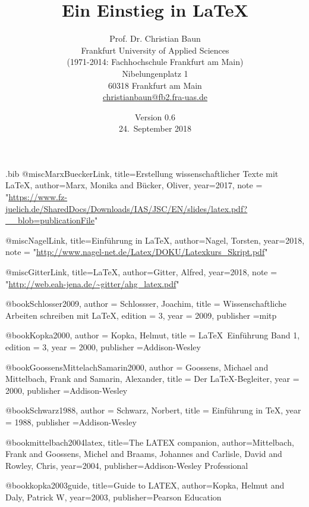 \documentclass[a4paper,10pt,twoside]{scrbook}
\begin{document}
\begin{filecontents*}{\jobname.bib}
@misc{MarxBueckerLink,
	title={{Erstellung wissenschaftlicher Texte mit \LaTeX}},
	author={Marx, Monika and Bücker, Oliver},
	year={2017},
	note = "\url{https://www.fz-juelich.de/SharedDocs/Downloads/IAS/JSC/EN/slides/latex.pdf?__blob=publicationFile}"
}
   
@misc{NagelLink,
   	title={{Einführung in \LaTeX}},
   	author={Nagel, Torsten},
   	year={2018},
   	note = "\url{http://www.nagel-net.de/Latex/DOKU/Latexkurs_Skript.pdf}"
}

@misc{GitterLink,
	title={{\LaTeX}},
	author={Gitter, Alfred},
	year={2018},
	note = "\url{http://web.eah-jena.de/~gitter/ahg_latex.pdf}"
}

@book{Schlosser2009,
	author = {Schlossser, Joachim},
	title = {{Wissenschaftliche Arbeiten schreiben mit \LaTeX}},
	edition = {3},
	year = {2009},
	publisher ={mitp}
}


@book{Kopka2000,
	author = {Kopka, Helmut},
	title = {{\LaTeX\ Einführung Band 1}},
	edition = {3},
	year = {2000},
	publisher ={Addison-Wesley}
}


@book{GoossensMittelachSamarin2000,
	author = {Goossens, Michael and Mittelbach, Frank and Samarin, Alexander},
	title = {{Der \LaTeX-Begleiter}},
	year = {2000},
	publisher ={Addison-Wesley}
}


@book{Schwarz1988,
	author = {Schwarz, Norbert},
	title = {{Einführung in \TeX}},
	year = {1988},
    publisher ={Addison-Wesley}
}
  
@book{mittelbach2004latex,
	title={The LATEX companion},
	author={Mittelbach, Frank and Goossens, Michel and Braams, Johannes and Carlisle, David and Rowley, Chris},
	year={2004},
	publisher={Addison-Wesley Professional}
}

@book{kopka2003guide,
	title={Guide to LATEX},
	author={Kopka, Helmut and Daly, Patrick W},
	year={2003},
	publisher={Pearson Education}
}

\end{filecontents*}

\renewcommand{\arraystretch}{1}

\title{Ein Einstieg in \LaTeX}
\author{Prof. Dr. Christian Baun\\ Frankfurt University of Applied Sciences \\ (1971-2014: Fachhochschule Frankfurt am Main)\\
Nibelungenplatz 1 \\ 60318 Frankfurt am Main\\\url{christianbaun@fb2.fra-uas.de}\\[3em]}
\date{Version 0.6\\[3em] 24.~September 2018}
\end{document}
